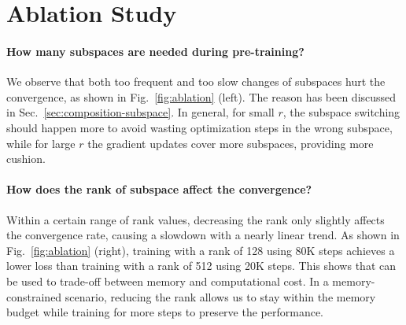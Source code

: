 \vspace{-2mm}
\section{Ablation Study}
\paragraph{How many subspaces are needed during pre-training?}

We observe that both too frequent and too slow changes of subspaces hurt the convergence, as shown in Fig.~\ref{fig:ablation} (left). The reason has been discussed in Sec.~\ref{sec:composition-subspace}. In general, for small $r$, the subspace switching should happen more to avoid wasting optimization steps in the wrong subspace, while for large $r$ the gradient updates cover more subspaces, providing more cushion. 





\paragraph{How does the rank of subspace affect the convergence?}
Within a certain range of rank values, decreasing the rank only slightly affects the convergence rate, causing a slowdown with a nearly linear trend.
As shown in Fig.~\ref{fig:ablation} (right), training with a rank of 128 using 80K steps achieves a lower loss than training with a rank of 512 using 20K steps.
This shows that \lowrank{} can be used to trade-off between memory and computational cost.
In a memory-constrained scenario, reducing the rank allows us to stay within the memory budget while training for more steps to preserve the performance.


